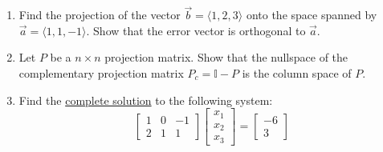 \documentclass[10pt, a4paper]{article}
\theoremstyle{break}
\begin{document}
\begin{enumerate}
\item Find the projection of the vector $\vec{b}=\langle 1,2,3 \rangle$ onto the space spanned by $\vec{a}=\langle 1,1,-1 \rangle$. Show that the error vector is orthogonal to $\vec{a}$. \\





\item Let $P$ be a $n \times n$ projection matrix. Show that the nullspace of the complementary projection matrix $P_c=\mathbb{I}-P$ is the column space of $P$. 
%


\item Find the \underline{complete solution} to the following system:
$$
\begin{bmatrix}
1 & 0 & -1 \\
2 & 1 & 1
\end{bmatrix}
\begin{bmatrix}
x_1 \\
x_2 \\
x_3
\end{bmatrix}
=
\begin{bmatrix}
-6 \\
3
\end{bmatrix} 
$$










\end{enumerate}
\end{document}
